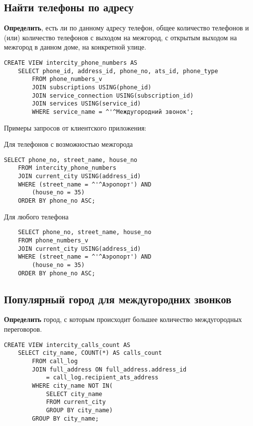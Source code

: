 \documentclass{report}
\begin{document}
\subsection{Найти телефоны по адресу}

\textbf{Определить}, есть ли по данному адресу телефон, общее 
количество телефонов и (или) количество телефонов с выходом на межгород, 
с открытым выходом на межгород в данном доме, на конкретной улице.

\begin{lstlisting}
CREATE VIEW intercity_phone_numbers AS
    SELECT phone_id, address_id, phone_no, ats_id, phone_type
        FROM phone_numbers_v
        JOIN subscriptions USING(phone_id)
        JOIN service_connection USING(subscription_id)
        JOIN services USING(service_id)
        WHERE service_name = ^'^Междугородний звонок';
\end{lstlisting}

Примеры запросов от клиентского приложения:

Для телефонов с возможностью межгорода
\begin{lstlisting}
SELECT phone_no, street_name, house_no
	FROM intercity_phone_numbers
	JOIN current_city USING(address_id)
	WHERE (street_name = ^'^Аэропорт') AND
		(house_no = 35)
	ORDER BY phone_no ASC;
\end{lstlisting}

Для любого телефона
\begin{lstlisting}
    SELECT phone_no, street_name, house_no
	FROM phone_numbers_v
	JOIN current_city USING(address_id)
	WHERE (street_name = ^'^Аэропорт') AND
		(house_no = 35)
	ORDER BY phone_no ASC;
\end{lstlisting}

\subsection{Популярный город для междугородних звонков}

\textbf{Определить} город, с которым происходит большее количество 
междугородных переговоров.

\begin{lstlisting}
CREATE VIEW intercity_calls_count AS
    SELECT city_name, COUNT(*) AS calls_count 
        FROM call_log 
        JOIN full_address ON full_address.address_id 
            = call_log.recipient_ats_address
        WHERE city_name NOT IN(
            SELECT city_name 
            FROM current_city 
            GROUP BY city_name)
        GROUP BY city_name;
\end{lstlisting}
\end{document}
